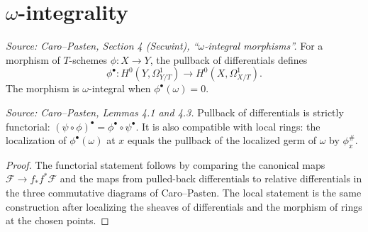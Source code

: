 \section{\texorpdfstring{\(\omega\)}{omega}-integrality}

\begin{definition}
  \label{def:cp_omega_integral}
  \textit{Source: Caro--Pasten, Section 4 (Secwint), ``$\omega$-integral morphisms''.}
  For a morphism of \(T\)-schemes \(\phi:X\to Y\), the pullback of
  differentials defines
  \[
    \phi^\bullet:H^0(Y,\Omega^1_{Y/T})\to H^0(X,\Omega^1_{X/T}).
  \]
  The morphism is \(\omega\)-integral when \(\phi^\bullet(\omega)=0\).
\end{definition}

\begin{lemma}
  \label{lem:cp_omega_integral_functorial_local}
  \textit{Source: Caro--Pasten, Lemmas 4.1 and 4.3.}
  Pullback of differentials is strictly functorial:
  \((\psi\circ\phi)^\bullet=\phi^\bullet\circ\psi^\bullet\).  It is also
  compatible with local rings: the localization of \(\phi^\bullet(\omega)\) at
  \(x\) equals the pullback of the localized germ of \(\omega\) by
  \(\phi_x^\#\).
\end{lemma}
\begin{proof}
  The functorial statement follows by comparing the canonical maps
  \(\mathcal F\to f_*f^*\mathcal F\) and the maps from pulled-back
  differentials to relative differentials in the three commutative diagrams of
  Caro--Pasten.  The local statement is the same construction after localizing
  the sheaves of differentials and the morphism of rings at the chosen points.
\end{proof}


